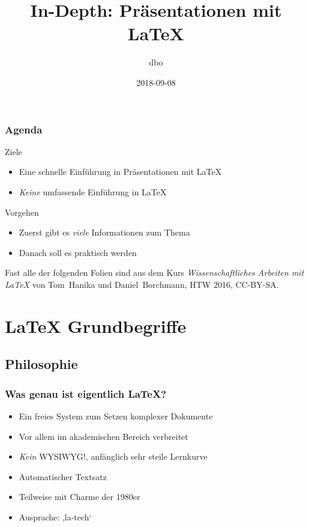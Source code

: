 \documentclass{cms-kurs}
\begin{document}
\title{In-Depth: Präsentationen mit \LaTeX{}}
\author{dbo}
\date{2018-09-08}

\maketitle{}

\begin{frame}
  \frametitle{Agenda}

  \onslide<+->

  \vfill

  \begin{block}{Ziele}
    \begin{itemize}
    \item Eine schnelle Einführung in Präsentationen mit \LaTeX{}
    \item \emph{Keine} umfassende Einführung in \LaTeX{}
    \end{itemize}
  \end{block}

  \vfill

  \onslide<+->

  \begin{block}{Vorgehen}
    \begin{itemize}
    \item Zuerst gibt es \emph{viele} Informationen zum Thema
    \item Danach soll es praktisch werden
    \end{itemize}
  \end{block}

  \bigskip{}

  Fast alle der folgenden Folien sind aus dem Kurs \emph{Wissenschaftliches
    Arbeiten mit \LaTeX} von Tom~Hanika und Daniel~Borchmann, HTW 2016,
  CC-BY-SA.

\end{frame}

\section{\LaTeX{} Grundbegriffe}

\subsection{Philosophie}

\begin{frame}
  \frametitle{Was genau ist eigentlich \LaTeX?}

  \onslide<+->

  \begin{itemize}
  \item Ein freies System zum Setzen komplexer Dokumente
  \item Vor allem im akademischen Bereich verbreitet
  \item \emph{Kein} WYSIWYG!, anfänglich sehr steile Lernkurve
  \item Automatischer Textsatz
  \item Teilweise mit Charme der 1980er
  \item Ausprache: ,la-tech‘
  \end{itemize}

\end{frame}
\end{document}
